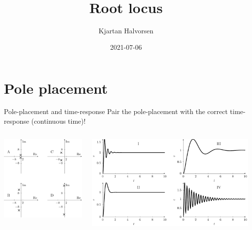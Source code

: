 \documentclass[presentation,aspectratio=169]{beamer}
\author{Kjartan Halvorsen}
\date{2021-07-06}
\title{Root locus}
\begin{document}
\maketitle

\section{Pole placement}
\label{sec:org9c42cbf}
\begin{frame}[label={sec:orgf8465c7}]{Pole-placement and time-response}
\alert{Pair the pole-placement with the correct time-response (continuous time)!}
\begin{columns}
\begin{column}{0.4\columnwidth}
\begin{center}
\includegraphics[width=\linewidth]{../../figures/pzmap-apollo}
\end{center}
\end{column}
\begin{column}{0.6\columnwidth}
\begin{center}
\includegraphics[width=\linewidth]{../../figures/step-response-apollo}
\end{center}
\end{column}
\end{columns}
\end{frame}
\end{document}
